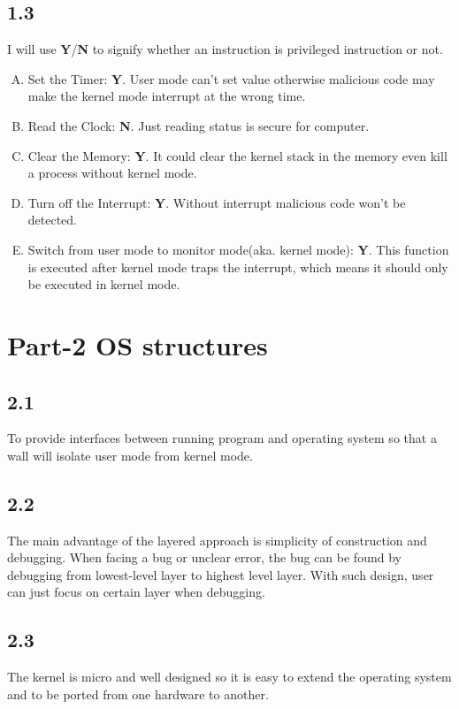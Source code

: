 \documentclass[11pt]{article}
\begin{document}
\subsection*{1.3}
    I will use \textbf{Y}/\textbf{N} to signify whether an instruction is privileged instruction or not.
\begin{enumerate}[A.]
    \item Set the Timer: \textbf{Y}. User mode can't set value otherwise malicious code may make the kernel mode interrupt
        at the wrong time.
    \item Read the Clock: \textbf{N}. Just reading status is secure for computer.
    \item Clear the Memory: \textbf{Y}. It could clear the kernel stack in the memory even kill a process without kernel mode. 
    \item Turn off the Interrupt: \textbf{Y}. Without interrupt malicious code won't be detected.
    \item Switch from user mode to monitor mode(aka. kernel mode): \textbf{Y}. This function is executed after kernel mode traps 
        the interrupt, which means it should only be executed in kernel mode. 
\end{enumerate}

\section*{Part-2 OS structures}
   
\subsection*{2.1}
To provide interfaces between running program and operating system so that a wall will isolate user mode from kernel mode. 

\subsection*{2.2}
The main advantage of the layered approach is simplicity of construction and debugging. When facing a bug or unclear error, 
the bug can be found by debugging from lowest-level layer to highest level layer. With such design, user can just focus on certain
layer when debugging.

\subsection*{2.3}
The kernel is micro and well designed so it is easy to extend the operating system and to be ported from one hardware to another.
\end{document}
